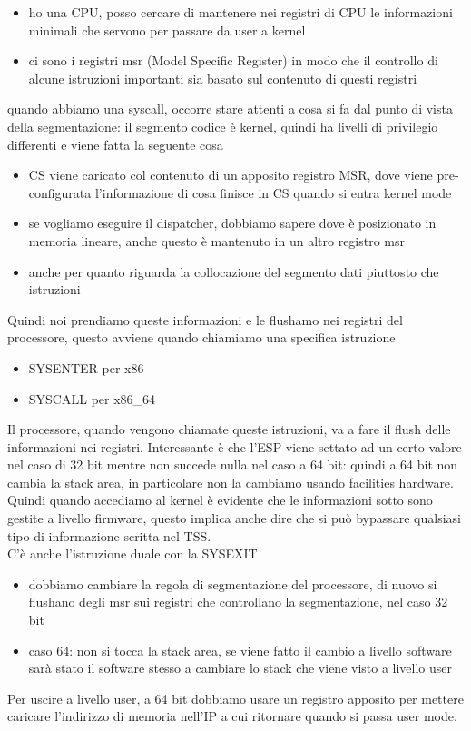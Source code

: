 \documentclass[12pt, oneside]{extbook}
\begin{document}
\begin{itemize}
\item ho una CPU, posso cercare di mantenere nei registri di CPU le informazioni minimali che servono per passare da user a kernel
\item ci sono i registri msr (Model Specific Register) in modo che il controllo di alcune istruzioni importanti sia basato sul contenuto di questi registri
\end{itemize}
quando abbiamo una syscall, occorre stare attenti a cosa si fa dal punto di vista della segmentazione: il segmento codice è kernel, quindi ha livelli di privilegio differenti e viene fatta la seguente cosa
\begin{itemize}
\item CS viene caricato col contenuto di un apposito registro MSR, dove viene pre-configurata l'informazione di cosa finisce in CS quando si entra kernel mode
\item se vogliamo eseguire il dispatcher, dobbiamo sapere dove è posizionato in memoria lineare, anche questo è mantenuto in un altro registro msr
\item anche per quanto riguarda la collocazione del segmento dati piuttosto che istruzioni
\end{itemize}
Quindi noi prendiamo queste informazioni e le flushamo nei registri del processore, questo avviene quando chiamiamo una specifica istruzione 
\begin{itemize}
\item SYSENTER per x86
\item SYSCALL per x86\_64
\end{itemize}
Il processore, quando vengono chiamate queste istruzioni, va a fare il flush delle informazioni nei registri. Interessante è che l'ESP viene settato ad un certo valore nel caso di 32 bit mentre non succede nulla nel caso a 64 bit: quindi a 64 bit non cambia la stack area, in particolare non la cambiamo usando facilities hardware. Quindi quando accediamo al kernel è evidente che le informazioni sotto sono gestite a livello firmware, questo implica anche dire che si può bypassare qualsiasi tipo di informazione scritta nel TSS.\\ C'è anche l'istruzione duale con la SYSEXIT
\begin{itemize}
\item dobbiamo cambiare la regola di segmentazione del processore, di nuovo si flushano degli msr sui registri che controllano la segmentazione, nel caso 32 bit
\item caso 64: non si tocca la stack area, se viene fatto il cambio a livello software sarà stato il software stesso a cambiare lo stack che viene visto a livello user
\end{itemize}
Per uscire a livello user, a 64 bit dobbiamo usare un registro apposito per mettere caricare l'indirizzo di memoria nell'IP a cui ritornare quando si passa user mode.
\end{document}
